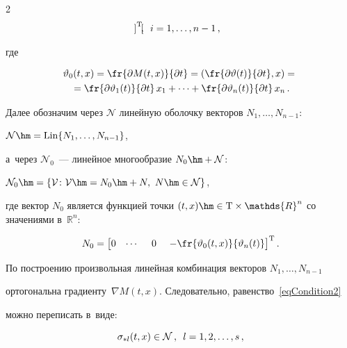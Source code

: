 \begin{multicols}{2}
\begin{multline*}
\begin{bmatrix}
\end{bmatrix}^\trans\!\!, \enskip  i = 1,\ldots,n-1\,,

\end{multline*}

где

\begin{multline*}

  \vartheta_0(t,x) = \fr{\partial M(t,x)}{\partial t} = \left( 

  \fr{\partial \vartheta(t)}{\partial t},x \right)

  = {}\\

  {}=\fr{\partial \vartheta_1(t)}{\partial t} \, x_1 + \cdots + 

  \fr{\partial \vartheta_n(t)}{\partial t} \, x_n\,.

\end{multline*}



Далее обозначим через $\mathcal{N}$ линейную оболочку векторов $N_1, \ldots, N_{n-1}$: 

$\mathcal{N} \hm= \mathrm{Lin} \{ N_1,\dots,N_{n-1} \}$,

а~через $\mathcal{N}_0$~--- линейное многообразие $N_0\hm + \mathcal{N}$:

 $\mathcal{N}_0 \hm= \{ \mathcal{V} \colon \mathcal{V}\hm = 

N_0\hm + N,\ N \hm\in \mathcal{N} \}$,

где вектор $N_0$ является функцией точки $(t,x)\hm \in \mathrm{T} \times 

\mathds{R}^n$ со значениями в~$\mathds{R}^n$:

$$

  N_0 = \begin{bmatrix} 

   0 & \cdots &~ 0~ & -\fr{\vartheta_0(t,x)}{\vartheta_n(t)} \end{bmatrix}^\trans.

$$



По построению произвольная линейная комбинация векторов $N_1, \ldots, N_{n-1}$ 

ортогональна градиенту~$\nabla M(t,x)$. Следовательно, равенство~\eqref{eqCondition2} 

можно переписать в~виде:

\begin{equation}\label{eqCondition2Geometry}

  \sigma_{* l}(t,x) \in \mathcal{N}\,,\enskip l = 1,2,\dots,s\,,


\end{equation}
\end{multicols}

